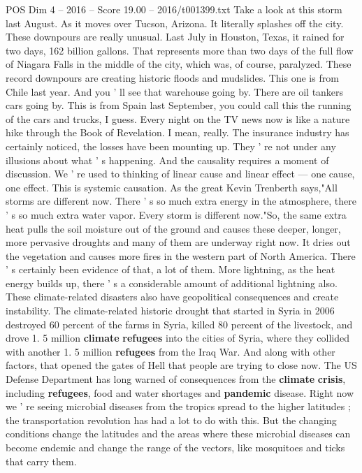 \begin{textsample}{POS Dim 4 – 2016 – Score 19.00 – 2016/t001399.txt}
Take a look at this storm last August.
As it moves over Tucson, Arizona.
It literally splashes off the city.
These downpours are really unusual.
Last July in Houston, Texas, it rained for two days, 162 billion gallons.
That represents more than two days of the full flow of Niagara Falls in the middle of the city, which was, of course, paralyzed.
These record downpours are creating historic floods and mudslides.
This one is from Chile last year.
And you ' ll see that warehouse going by.
There are oil tankers cars going by.
This is from Spain last September, you could call this the running of the cars and trucks, I guess.
Every night on the TV news now is like a nature hike through the Book of Revelation.
I mean, really.
The insurance industry has certainly noticed, the losses have been mounting up.
They ' re not under any illusions about what ' s happening.
And the causality requires a moment of discussion.
We ' re used to thinking of linear cause and linear effect — one cause, one effect.
This is systemic causation.
As the great Kevin Trenberth says,"All storms are different now.
There ' s so much extra energy in the atmosphere, there ' s so much extra water vapor.
Every storm is different now."So, the same extra heat pulls the soil moisture out of the ground and causes these deeper, longer, more pervasive droughts and many of them are underway right now.
It dries out the vegetation and causes more fires in the western part of North America.
There ' s certainly been evidence of that, a lot of them.
More lightning, as the heat energy builds up, there ' s a considerable amount of additional lightning also.
These climate-related disasters also have geopolitical consequences and create instability.
The climate-related historic drought that started in Syria in 2006 destroyed 60 percent of the farms in Syria, killed 80 percent of the livestock, and drove 1. 5 million \textbf{climate} \textbf{refugees} into the cities of Syria, where they collided with another 1. 5 million \textbf{refugees} from the Iraq War.
And along with other factors, that opened the gates of Hell that people are trying to close now.
The US Defense Department has long warned of consequences from the \textbf{climate} \textbf{crisis}, including \textbf{refugees}, food and water shortages and \textbf{pandemic} disease.
Right now we ' re seeing microbial diseases from the tropics spread to the higher latitudes ; the transportation revolution has had a lot to do with this.
But the changing conditions change the latitudes and the areas where these microbial diseases can become endemic and change the range of the vectors, like mosquitoes and ticks that carry them.

\end{textsample}

